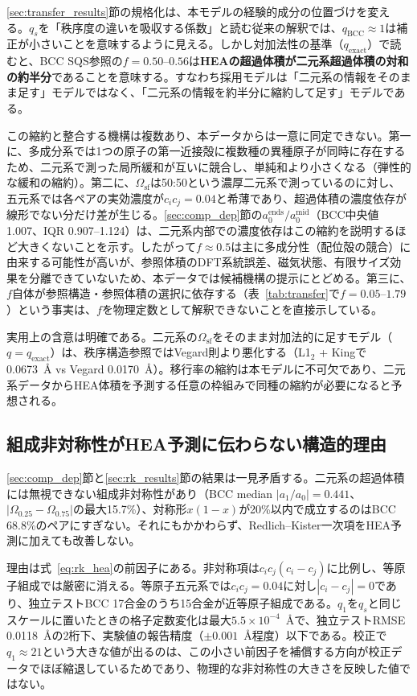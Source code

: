 \documentclass[5p,10pt]{elsarticle}
\begin{document}
\ref{sec:transfer_results}節の規格化は、本モデルの経験的成分の位置づけを変える。$q_s$を「秩序度の違いを吸収する係数」と読む従来の解釈では、$q_\text{BCC} \approx 1$は補正が小さいことを意味するように見える。しかし対加法性の基準（$q_\text{exact}$）で読むと、BCC SQS参照の$f = 0.50$--$0.56$は\textbf{HEAの超過体積が二元系超過体積の対和の約半分}であることを意味する。すなわち採用モデルは「二元系の情報をそのまま足す」モデルではなく、「二元系の情報を約半分に縮約して足す」モデルである。

この縮約と整合する機構は複数あり、本データからは一意に同定できない。第一に、多成分系では1つの原子の第一近接殻に複数種の異種原子が同時に存在するため、二元系で測った局所緩和が互いに競合し、単純和より小さくなる（弾性的な緩和の縮約）。第二に、$\Omega_\text{sf}$は50:50という濃厚二元系で測っているのに対し、五元系では各ペアの実効濃度が$c_i c_j = 0.04$と希薄であり、超過体積の濃度依存が線形でない分だけ差が生じる。\ref{sec:comp_dep}節の$a_0^\text{ends}/a_0^\text{mid}$（BCC中央値1.007、IQR 0.907--1.124）は、二元系内部での濃度依存はこの縮約を説明するほど大きくないことを示す。したがって$f \approx 0.5$は主に多成分性（配位殻の競合）に由来する可能性が高いが、参照体積のDFT系統誤差、磁気状態、有限サイズ効果を分離できていないため、本データでは候補機構の提示にとどめる。第三に、$f$自体が参照構造・参照体積の選択に依存する（表~\ref{tab:transfer}で$f = 0.05$--$1.79$）という事実は、$f$を物理定数として解釈できないことを直接示している。

実用上の含意は明確である。二元系の$\Omega_\text{sf}$をそのまま対加法的に足すモデル（$q = q_\text{exact}$）は、秩序構造参照ではVegard則より悪化する（L1$_2$ + Kingで0.0673~\AA{} vs Vegard 0.0170~\AA）。移行率の縮約は本モデルに不可欠であり、二元系データからHEA体積を予測する任意の枠組みで同種の縮約が必要になると予想される。

\subsection{組成非対称性がHEA予測に伝わらない構造的理由}
\label{sec:disc_asymmetry}

\ref{sec:comp_dep}節と\ref{sec:rk_results}節の結果は一見矛盾する。二元系の超過体積には無視できない組成非対称性があり（BCC median $|a_1/a_0| = 0.441$、$|\Omega_{0.25}-\Omega_{0.75}|$の最大15.7\%）、対称形$x(1-x)$が20\%以内で成立するのはBCC 68.8\%のペアにすぎない。それにもかかわらず、Redlich--Kister一次項をHEA予測に加えても改善しない。

理由は式~\eqref{eq:rk_hea}の前因子にある。非対称項は$c_i c_j (c_i - c_j)$に比例し、等原子組成では厳密に消える。等原子五元系では$c_i c_j = 0.04$に対し$|c_i - c_j| = 0$であり、独立テストBCC 17合金のうち15合金が近等原子組成である。$q_1$を$q_s$と同じスケールに置いたときの格子定数変化は最大$5.5\times10^{-4}$~\AA{}で、独立テストRMSE 0.0118~\AA{}の2桁下、実験値の報告精度（$\pm 0.001$~\AA{}程度）以下である。校正で$q_1 \approx 21$という大きな値が出るのは、この小さい前因子を補償する方向が校正データでほぼ縮退しているためであり、物理的な非対称性の大きさを反映した値ではない。
\end{document}
